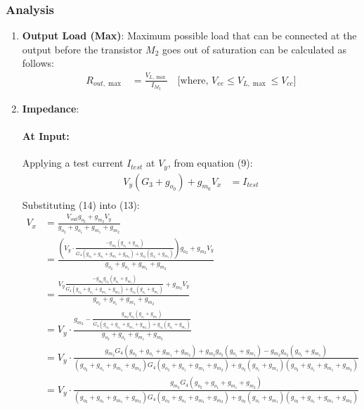 \subsubsection{Analysis}
\begin{enumerate}
  \item \textbf{Output Load (Max)}: Maximum possible
    load that can be connected at the output before
    the transistor $M_2$ goes out of saturation can
    be calculated as follows:
    \begin{align*}
      R_{out, \max} &= \frac{V_{L, \max}}{I_{M_2}} \quad \text{[where, } V_{ee} \leq V_{L, \max} \leq V_{cc} \text{]}
    \end{align*}
  \item \textbf{Impedance}:
    \paragraph{At Input:} Applying a test current $I_{test}$
      at $V_{y}$, from equation (9):
      \begin{align*}
        V_{y}(G_3 + g_{o_0}) + g_{m_0}V_{x} &= I_{test} \\
      \end{align*}
      Substituting (14) into (13):
      \begin{align*}
        V_{x} &= \frac{V_{out}g_{o_2} + g_{m_2}V_{y}}{g_{o_2} + g_{o_1} + g_{m_1} + g_{m_2}} \\
              &= \frac{\left(V_{y} \cdot \frac{-g_{m_2}(g_{o_1} + g_{m_1})}{G_4(g_{o_2} + g_{o_1} + g_{m_1} + g_{m_2}) + g_{o_2}(g_{o_1} + g_{m_1})}\right)g_{o_2} + g_{m_2}V_{y}}{g_{o_2} + g_{o_1} + g_{m_1} + g_{m_2}} \\
              &= \frac{V_{y}\frac{-g_{m_2}g_{o_2}(g_{o_1} + g_{m_1})}{G_4(g_{o_2} + g_{o_1} + g_{m_1} + g_{m_2}) + g_{o_2}(g_{o_1} + g_{m_1})} + g_{m_2}V_{y}}{g_{o_2} + g_{o_1} + g_{m_1} + g_{m_2}} \\
              &= V_{y} \cdot \frac{g_{m_2} - \frac{g_{m_2}g_{o_2}(g_{o_1} + g_{m_1})}{G_4(g_{o_2} + g_{o_1} + g_{m_1} + g_{m_2}) + g_{o_2}(g_{o_1} + g_{m_1})}}{g_{o_2} + g_{o_1} + g_{m_1} + g_{m_2}} \\
              &= V_{y} \cdot \frac{g_{m_2}G_4(g_{o_2} + g_{o_1} + g_{m_1} + g_{m_2}) + g_{m_2}g_{o_2}(g_{o_1} + g_{m_1}) - g_{m_2}g_{o_2}(g_{o_1} + g_{m_1})}{(g_{o_2} + g_{o_1} + g_{m_1} + g_{m_2})G_4(g_{o_2} + g_{o_1} + g_{m_1} + g_{m_2}) + g_{o_2}(g_{o_1} + g_{m_1})(g_{o_2} + g_{o_1} + g_{m_1} + g_{m_2})} \\
              &= V_{y} \cdot \frac{g_{m_2}G_4(g_{o_2} + g_{o_1} + g_{m_1} + g_{m_2})}{(g_{o_2} + g_{o_1} + g_{m_1} + g_{m_2})G_4(g_{o_2} + g_{o_1} + g_{m_1} + g_{m_2}) + g_{o_2}(g_{o_1} + g_{m_1})(g_{o_2} + g_{o_1} + g_{m_1} + g_{m_2})} \\

\end{align*}
\end{enumerate}
